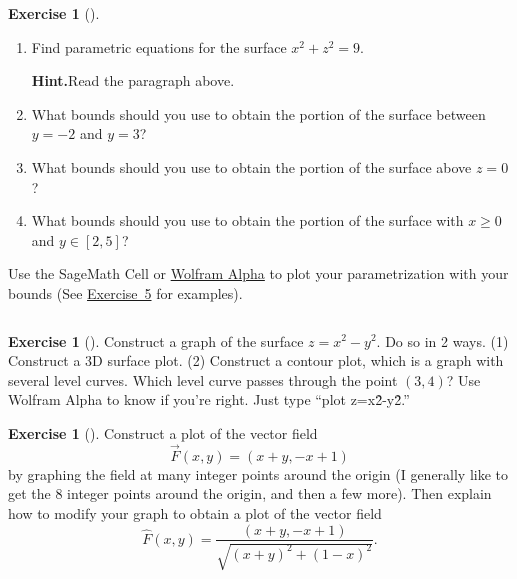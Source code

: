 \documentclass[10pt,]{book}
\theoremstyle{plain}
\theoremstyle{definition}
\theoremstyle{definition}
\theoremstyle{definition}
\theoremstyle{definition}
\newtheorem{exploration}[project]{Exercise}
\theoremstyle{definition}
\numberwithin{equation}{section}
\begin{document}
\begin{exploration}[]\label{exploration-128}
\leavevmode%
\begin{enumerate}[font=\bfseries,label=(\alph*),ref=\alph*]
\item\label{task-252} Find parametric equations for the surface \(x^2+z^2=9\).%
\par\medskip\noindent%
\textbf{Hint.}\quad Read the paragraph above.%
\item\label{task-253} What bounds should you use to obtain the portion of the surface between \(y=-2\) and \(y=3\)?%
\item\label{task-254} What bounds should you use to obtain the portion of the surface above \(z=0\)?%
\item\label{task-255} What bounds should you use to obtain the portion of the surface with \(x\geq 0\) and \(y\in[2,5]\)?%
\end{enumerate}
\bigbreak
Use the SageMath Cell or \href{http://wolframalpha.com}{Wolfram Alpha} to plot your parametrization with your bounds (See \hyperref[x3d_parametric_plot]{Exercise~5} for examples).%
\begin{lstlisting}[style=sageinput]

\end{lstlisting}
\end{exploration}
\begin{exploration}[]\label{exploration-129}
Construct a graph of the surface \(z = x^2-y^2\). Do so in 2 ways. (1) Construct a 3D surface plot. (2) Construct a contour plot, which is a graph with several level curves. Which level curve passes through the point \((3,4)\)? Use Wolfram Alpha to know if you're right. Just type ``plot z=x\^2-y\^2.''%
\end{exploration}
\begin{exploration}[]\label{exploration-130}
Construct a plot of the vector field%
\begin{equation*}
\vec F(x,y) = (x+y, -x+1)
\end{equation*}
by graphing the field at many integer points around the origin (I generally like to get the 8 integer points around the origin, and then a few more). Then explain how to modify your graph to obtain a plot of the vector field%
\begin{equation*}
\hat F(x,y) = \frac{(x+y, -x+1)}{\sqrt{(x+y)^2+(1-x)^2}}.
\end{equation*}
%
\end{exploration}
\typeout{************************************************}
\typeout{************************************************}
\end{document}
